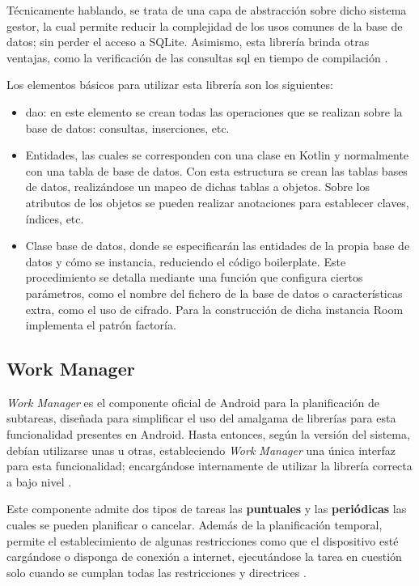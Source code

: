         Técnicamente hablando, se trata de una capa de abstracción sobre dicho sistema gestor, la cual permite reducir la complejidad de los usos comunes de la base de datos; sin perder el acceso a SQLite. Asimismo, esta librería brinda otras ventajas, como la verificación de las consultas
        \gls{sql} en tiempo de compilación \cite{android_developers_como_nodate}.

        Los elementos básicos para utilizar esta librería son los siguientes:
        \begin{itemize}
            \item \gls{dao}: en este elemento se crean todas las operaciones que se realizan sobre la base de datos: consultas, inserciones, etc.
            \item Entidades, las cuales se corresponden con una clase en Kotlin y normalmente con una tabla de base de datos. Con esta estructura se crean las tablas bases de datos, realizándose un mapeo de dichas tablas a objetos. Sobre los atributos de los objetos se pueden realizar anotaciones para establecer claves, índices, etc.
            \item Clase base de datos, donde se especificarán las entidades de la propia base de datos y cómo se instancia, reduciendo el código \gls{boilerplate}. Este procedimiento se detalla mediante una función que configura ciertos parámetros, como el nombre del fichero de la base de datos o características extra, como el uso de cifrado. Para la construcción de dicha instancia Room implementa el patrón factoría.
        \end{itemize}
    
    \subsection{Work Manager}
        \textit{Work Manager} es el componente oficial de Android para la planificación de subtareas, diseñada para simplificar el uso del amalgama de librerías para esta
        funcionalidad presentes en Android. Hasta entonces, según la versión del sistema, debían utilizarse unas u otras, estableciendo \textit{Work Manager} una única interfaz para esta funcionalidad; encargándose internamente de utilizar la librería correcta a bajo nivel \cite{android_developers_workmanager_nodate}.
        
        Este componente admite dos tipos de tareas las \textbf{puntuales} y las \textbf{periódicas} las cuales se pueden planificar o cancelar. Además de la planificación temporal, permite el establecimiento de algunas restricciones
        como que el dispositivo esté cargándose o disponga de conexión a internet, ejecutándose la tarea en cuestión solo cuando se cumplan todas las restricciones y directrices \cite{android_developers_arquitectura_nodate}.

